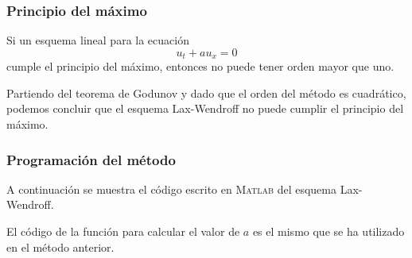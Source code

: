 \documentclass[spanish]{mathnotes}
\begin{document}
	\subsubsection{Principio del máximo}
	\begin{thm}
		Si un esquema lineal para la ecuación $$u_t+au_x = 0$$
		cumple el principio del máximo, entonces no puede tener orden mayor que uno.
	\end{thm}
	Partiendo del teorema de Godunov y dado que el orden del método es cuadrático, podemos concluir que el esquema Lax-Wendroff no puede cumplir el principio del máximo.\newpage
	\subsubsection{Programación del método}
	A continuación se muestra el código escrito en \textsc{Matlab} del esquema Lax-Wendroff.
	\lstset{style=matlabStyle}
	
	El código de la función para calcular el valor de $a$ es el mismo que se ha utilizado en el método anterior.
\end{document}
